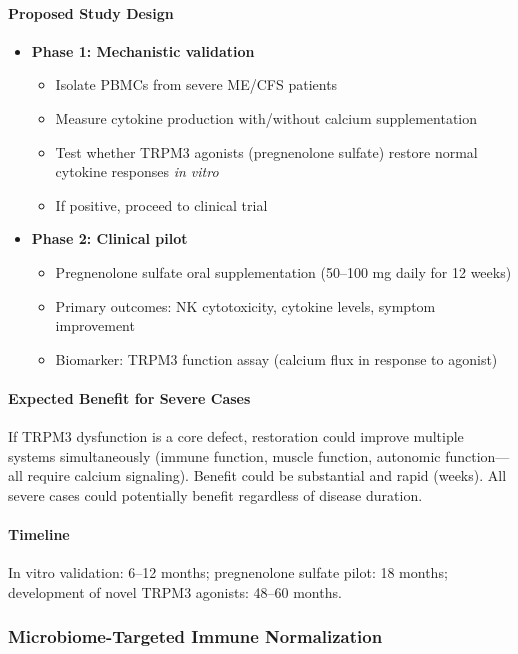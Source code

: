 \paragraph{Proposed Study Design}
\begin{itemize}
    \item \textbf{Phase 1: Mechanistic validation}
    \begin{itemize}
        \item Isolate PBMCs from severe ME/CFS patients
        \item Measure cytokine production with/without calcium supplementation
        \item Test whether TRPM3 agonists (pregnenolone sulfate) restore normal cytokine responses \emph{in vitro}
        \item If positive, proceed to clinical trial
    \end{itemize}
    \item \textbf{Phase 2: Clinical pilot}
    \begin{itemize}
        \item Pregnenolone sulfate oral supplementation (50--100 mg daily for 12 weeks)
        \item Primary outcomes: NK cytotoxicity, cytokine levels, symptom improvement
        \item Biomarker: TRPM3 function assay (calcium flux in response to agonist)
    \end{itemize}
\end{itemize}

\paragraph{Expected Benefit for Severe Cases}
If TRPM3 dysfunction is a core defect, restoration could improve multiple systems simultaneously (immune function, muscle function, autonomic function—all require calcium signaling). Benefit could be substantial and rapid (weeks). All severe cases could potentially benefit regardless of disease duration.

\paragraph{Timeline}
In vitro validation: 6--12 months; pregnenolone sulfate pilot: 18 months; development of novel TRPM3 agonists: 48--60 months.

\subsubsection{Microbiome-Targeted Immune Normalization}


